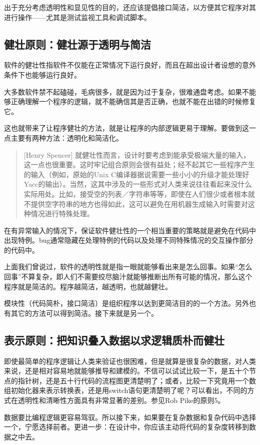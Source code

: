 \documentclass[12pt,oneside]{book}
\begin{document}
出于充分考虑透明性和显见性的目的，还应该提倡接口简洁，以方便其它程序对其进行操作——尤其是测试监视工具和调试脚本。


\subsection{健壮原则：健壮源于透明与简洁}
软件的健壮性指软件不仅能在正常情况下运行良好，而且在超出设计者设想的意外条件下也能够运行良好。

大多数软件禁不起磕碰，毛病很多，就是因为过于复杂，很难通盘考虑。如果不能够正确理解一个程序的逻辑，就不能确信其是否正确，也就不能在出错的时候修复它。

这也就带来了让程序健壮的方法，就是让程序的内部逻辑更易于理解。要做到这一点主要有两种方法：透明化和简洁化。
\begin{quote}[Henry Spencer]
就健壮性而言，设计时要考虑到能承受极端大量的输入，这一点也很重要。这时牢记组合原则会很有益处；经不起其它一些程序产生的输入（例如，原始的Unix C编译器据说需要一些小小的升级才能处理好Yacc的输出）。当然，这其中涉及的一些形式对人类来说往往看起来没什么实际用处。比如，接受空的列表／字符串等等，即使在人们很少或者根本就不提供空字符串的地方也得如此，这可以避免在用机器生成输入时需要对这种情况进行特殊处理。
\end{quote}
    
在有异常输入的情况下，保证软件健壮性的一个相当重要的策略就是避免在代码中出现特例。bug通常隐藏在处理特例的代码以及处理不同特殊情况的交互操作部分的代码中。

上面我们曾说过，软件的透明性就是指一眼就能够看出来是怎么回事。如果“怎么回事”不算复杂，即人们不需要绞尽脑汁就能够推断出所有可能的情况，那么这个程序就是简洁的。程序越简洁，越透明，也就越健壮。

模块性（代码简朴，接口简洁）是组织程序以达到更简洁目的的一个方法。另外也有其它的方法可以得到简洁。接下来就是另一个。

\subsection{表示原则：把知识叠入数据以求逻辑质朴而健壮}
即使最简单的程序逻辑让人类来验证也很困难，但是就算是很复杂的数据，对人类来说，还是相对容易地就能够推导和建模的。不信可以试试比较一下，是五十个节点的指针树，还是五十行代码的流程图更清楚明了；或者，比较一下究竟用一个数组初始化器来表示转换表，还是用switch语句更清楚明了呢？可以看出，不同的方式在透明性和清晰性方面具有非常显著的差别。参见Rob Pike的原则5。

数据要比编程逻辑更容易驾驭。所以接下来，如果要在复杂数据和复杂代码中选择一个，宁愿选择前者。更进一步：在设计中，你应该主动将代码的复杂度转移到数据之中去。
\end{document}
